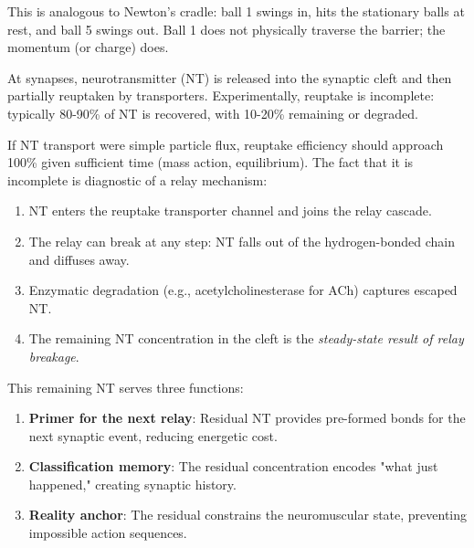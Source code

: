 \begin{corollary}
\begin{principle}
This is analogous to Newton's cradle: ball 1 swings in, hits the stationary balls at rest, and ball 5 swings out. Ball 1 does not physically traverse the barrier; the momentum (or charge) does.
\end{principle}

\begin{theorem}
\label{thm:reuptake-incomplete}
At synapses, neurotransmitter (NT) is released into the synaptic cleft and then partially reuptaken by transporters. Experimentally, reuptake is incomplete: typically 80-90\% of NT is recovered, with 10-20\% remaining or degraded.

If NT transport were simple particle flux, reuptake efficiency should approach 100\% given sufficient time (mass action, equilibrium). The fact that it is incomplete is diagnostic of a relay mechanism:

\begin{enumerate}[label=(\roman*), noitemsep]
\item NT enters the reuptake transporter channel and joins the relay cascade.
\item The relay can break at any step: NT falls out of the hydrogen-bonded chain and diffuses away.
\item Enzymatic degradation (e.g., acetylcholinesterase for ACh) captures escaped NT.
\item The remaining NT concentration in the cleft is the \emph{steady-state result of relay breakage}.
\end{enumerate}

This remaining NT serves three functions:
\begin{enumerate}[label=(\arabic*), noitemsep]
\item \textbf{Primer for the next relay}: Residual NT provides pre-formed bonds for the next synaptic event, reducing energetic cost.
\item \textbf{Classification memory}: The residual concentration encodes "what just happened," creating synaptic history.
\item \textbf{Reality anchor}: The residual constrains the neuromuscular state, preventing impossible action sequences.
\end{enumerate}
\end{theorem}


\end{corollary}
